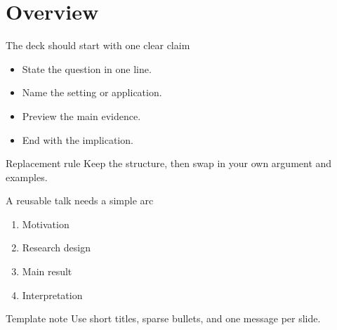 \section{Overview}

\begin{frame}{The deck should start with one clear claim}
\begin{itemize}
  \setlength{\itemsep}{6pt}
  \item State the question in one line.
  \item Name the setting or application.
  \item Preview the main evidence.
  \item End with the implication.
\end{itemize}
\vfill
\begin{block}{Replacement rule}
Keep the structure, then swap in your own argument and examples.
\end{block}
\end{frame}

\begin{frame}{A reusable talk needs a simple arc}
\begin{enumerate}
  \setlength{\itemsep}{7pt}
  \item Motivation
  \item Research design
  \item Main result
  \item Interpretation
\end{enumerate}
\vfill
\begin{exampleblock}{Template note}
Use short titles, sparse bullets, and one message per slide.
\end{exampleblock}
\end{frame}